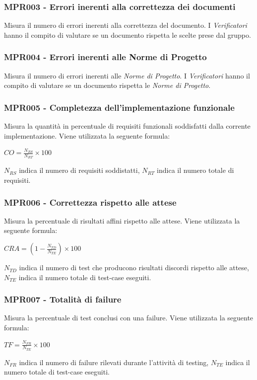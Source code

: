 \subsubsection{MPR003 - Errori inerenti alla correttezza dei documenti}
Misura il numero di errori inerenti alla correttezza del documento. I \textit{Verificatori} hanno il compito di valutare se un documento rispetta le scelte prese dal gruppo.

\subsubsection{MPR004 - Errori inerenti alle Norme di Progetto}
Misura il numero di errori inerenti alle \textit{Norme di Progetto}. I \textit{Verificatori} hanno il compito di valutare se un documento rispetta le \textit{Norme di Progetto}.


\subsubsection{MPR005 - Completezza dell'implementazione funzionale}
Misura la quantità in percentuale di requisiti funzionali soddisfatti dalla corrente implementazione. Viene utilizzata la seguente formula: 
\begin{center}{$CO=\frac{N_{RS}}{N_{RT}}\times 100$}\end{center}
$N_{RS}$  indica il numero di requisiti soddistatti, $N_{RT}$  indica il numero totale di requisiti.

\subsubsection{MPR006 - Correttezza  rispetto alle attese}
Misura la percentuale di risultati affini rispetto alle attese. Viene utilizzata la seguente formula:
\begin{center}{$CRA=(1-\frac{N_{TD}}{N_{TE}})\times 100$}\end{center}
${N_{TD}}$ indica il numero di test che producono risultati discordi rispetto alle attese, ${N_{TE}}$ indica il numero totale di test-case eseguiti.

\subsubsection{MPR007 - Totalità di failure}
Misura la percentuale di test conclusi con una failure. Viene utilizzata la seguente formula:
\begin{center}{$TF=\frac{N_{FR}}{N_{TE}}\times 100$}\end{center}
${N_{FR}}$ indica il numero di failure rilevati durante l'attività di testing,
${N_{TE}}$ indica il numero totale di test-case eseguiti.

